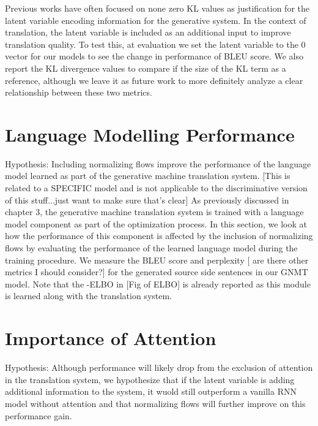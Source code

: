 Previous works have often focused on none zero KL values as justification for the latent variable encoding information for the generative system. In the context of translation, the latent variable is included as an additional input to improve translation quality. To test this, at evaluation we set the latent variable to the 0 vector for our models to see the change in performance of BLEU score. We also report the KL divergence values to compare if the size of the KL term as a reference, although we leave it as future work to more definitely analyze a clear relationship between these two metrics. 

\section{Language Modelling Performance}

Hypothesis: Including normalizing flows improve the performance of the language model learned as part of the generative machine translation system. [This is related to a SPECIFIC model and is not applicable to the discriminative version of this stuff...just want to make sure that's clear]
As previously discussed in chapter 3, the generative machine translation system is trained with a language model component as part of the optimization process. In this section, we look at how the performance of this component is affected by the inclusion of normalizing flows by evaluating the performance of the learned language model during the training procedure. We measure the BLEU score and perplexity  [ are there other metrics I should consider?] for the generated source side sentences in our GNMT model. Note that the -ELBO in [Fig of ELBO] is already reported as this module is learned along with the translation system.

\section{Importance of Attention}

Hypothesis:  Although performance will likely drop from the exclusion of attention in the translation system, we hypothesize that if the latent variable is adding additional information to the system, it wuold still outperform a vanilla RNN model without attention and that normalizing flows will further improve on this performance gain.

